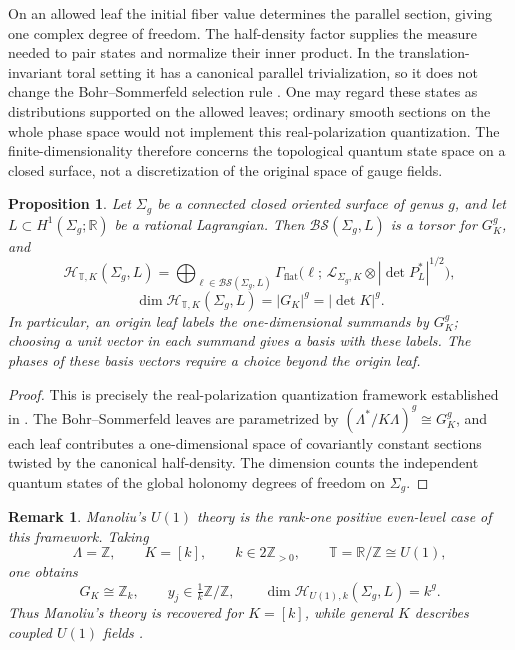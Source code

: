 \documentclass[12pt]{amsart}
\numberwithin{equation}{section}
\newtheorem{prop}[theorem]{Proposition}
\newtheorem*{remark}{Remark}
\theoremstyle{definition}
\begin{document}
On an allowed leaf the initial fiber value determines the parallel section, giving one complex degree of freedom. The half-density factor supplies the measure needed to pair states and normalize their inner product. In the translation-invariant toral setting it has a canonical parallel trivialization, so it does not change the Bohr--Sommerfeld selection rule \cite[Propositions~2.13--2.16]{Galviz2}. One may regard these states as distributions supported on the allowed leaves; ordinary smooth sections on the whole phase space would not implement this real-polarization quantization. The finite-dimensionality therefore concerns the topological quantum state space on a closed surface, not a discretization of the original space of gauge fields.

\begin{prop}\cite[Proposition 2.14, Definition 2.15, Theorem 2.17]{Galviz2}
\label{prop:toral-hilbert-space}
Let $\Sigma_g$ be a connected closed oriented surface of genus $g$, and let
$L\subset H^1(\Sigma_g;\mathbb R)$ be a rational Lagrangian. Then $\mathcal{BS}(\Sigma_g,L)$ is a torsor for $G_K^g$, and
$$
\mathcal H_{\mathbb T,K}(\Sigma_g,L)
=
\bigoplus_{\ell\in \mathcal{BS}(\Sigma_g,L)}
\Gamma_{\mathrm{flat}}\!\bigl(\ell;\,\mathcal L_{\Sigma_g,K}\otimes |\det P_L^*|^{1/2}\bigr),
$$
$$
\dim \mathcal H_{\mathbb T,K}(\Sigma_g,L)=|G_K|^g=|\det K|^g.
$$
In particular, an origin leaf labels the one-dimensional summands by $G_K^g$; choosing a unit vector in each summand gives a basis with these labels. The phases of these basis vectors require a choice beyond the origin leaf.
\end{prop}

\begin{proof}
This is precisely the real-polarization quantization framework established in \cite{Galviz2}.  The Bohr--Sommerfeld leaves are parametrized by $(\Lambda^*/K\Lambda)^g\cong G_K^g$, and each leaf contributes a one-dimensional space of covariantly constant sections twisted by the canonical half-density. The dimension counts the independent quantum states of the global
holonomy degrees of freedom on $\Sigma_g$.
\end{proof}



\begin{remark}
Manoliu's $U(1)$ theory is the rank-one positive even-level case of this framework. Taking
$$
\Lambda=\mathbb Z,\qquad K=[k],\qquad k\in 2\mathbb Z_{>0},
\qquad \mathbb T=\mathbb R/\mathbb Z\cong U(1),
$$
one obtains
$$
G_K\cong\mathbb Z_k,\qquad
y_j\in\tfrac1k\mathbb Z/\mathbb Z,\qquad
\dim\mathcal H_{U(1),k}(\Sigma_g,L)=k^g.
$$
Thus Manoliu's theory is recovered for $K=[k]$, while general $K$ describes coupled $U(1)$ fields \cite[Sec.~5.1]{Manoliu2}\cite[Corollary~4.9]{Galviz2}.
\end{remark}
\end{document}

